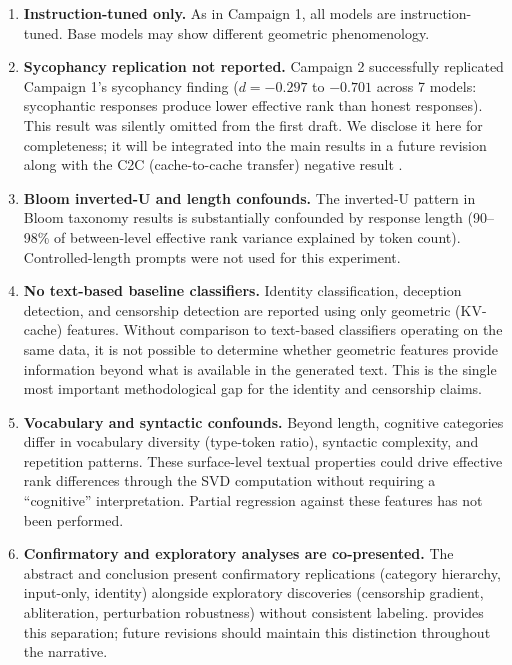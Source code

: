 \documentclass[11pt,a4paper]{article}
\begin{document}
\begin{enumerate}[leftmargin=*]
    \item \textbf{Instruction-tuned only.} As in Campaign 1, all models are instruction-tuned. Base models may show different geometric phenomenology.

    \item \textbf{Sycophancy replication not reported.} Campaign 2 successfully replicated Campaign 1's sycophancy finding ($d = -0.297$ to $-0.701$ across 7 models: sycophantic responses produce lower effective rank than honest responses). This result was silently omitted from the first draft. We disclose it here for completeness; it will be integrated into the main results in a future revision along with the C2C (cache-to-cache transfer) negative result \citep{fu2025c2c}.

    \item \textbf{Bloom inverted-U and length confounds.} The inverted-U pattern in Bloom taxonomy results is substantially confounded by response length (90--98\% of between-level effective rank variance explained by token count). Controlled-length prompts were not used for this experiment.

    \item \textbf{No text-based baseline classifiers.} Identity classification, deception detection, and censorship detection are reported using only geometric (KV-cache) features. Without comparison to text-based classifiers operating on the same data, it is not possible to determine whether geometric features provide information beyond what is available in the generated text. This is the single most important methodological gap for the identity and censorship claims.

    \item \textbf{Vocabulary and syntactic confounds.} Beyond length, cognitive categories differ in vocabulary diversity (type-token ratio), syntactic complexity, and repetition patterns. These surface-level textual properties could drive effective rank differences through the SVD computation without requiring a ``cognitive'' interpretation. Partial regression against these features has not been performed.

    \item \textbf{Confirmatory and exploratory analyses are co-presented.} The abstract and conclusion present confirmatory replications (category hierarchy, input-only, identity) alongside exploratory discoveries (censorship gradient, abliteration, perturbation robustness) without consistent labeling.  provides this separation; future revisions should maintain this distinction throughout the narrative.
\end{enumerate}
\end{document}
